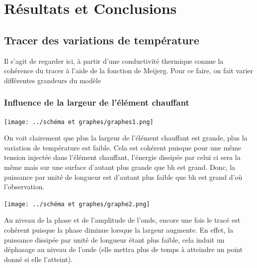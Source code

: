 \documentclass[10pt,a4paper]{report}
\begin{document}
\section{Résultats et Conclusions}
\subsection{Tracer des variations de température}
Il s'agit de regarder ici, à partir d'une conductivité thermique connue la cohérence du tracer à l'aide de la fonction de Meijerg.
Pour ce faire, on fait varier différentes grandeurs du modèle
\subsubsection{Influence de la largeur de l'élément chauffant}
\begin{center}
\texttt{[image: ../schéma et graphes/graphes1.png]}
\end{center}
On voit clairement que plus la largeur de l'élément chauffant est grande, plus la variation de température est faible. Cela est cohérent puisque pour une même tension injectée dans l'élément chauffant, l'énergie dissipée par celui ci sera la même mais sur une surface d'autant plus grande que bh est grand. Donc, la puissance par unité de longueur est d'autant plus faible que bh est grand d'où l'observation.
\begin{center}
\texttt{[image: ../schéma et graphes/graphe2.png]}
\end{center}
Au niveau de la phase et de l'amplitude de l'onde, encore une fois le tracé est cohérent puisque la phase diminue lorsque la largeur augmente. En effet, la puissance dissipée par unité de longueur étant plus faible, cela induit un déphasage au niveau de l'onde (elle mettra plus de temps à atteindre un point donné si elle l'atteint).
\end{document}

